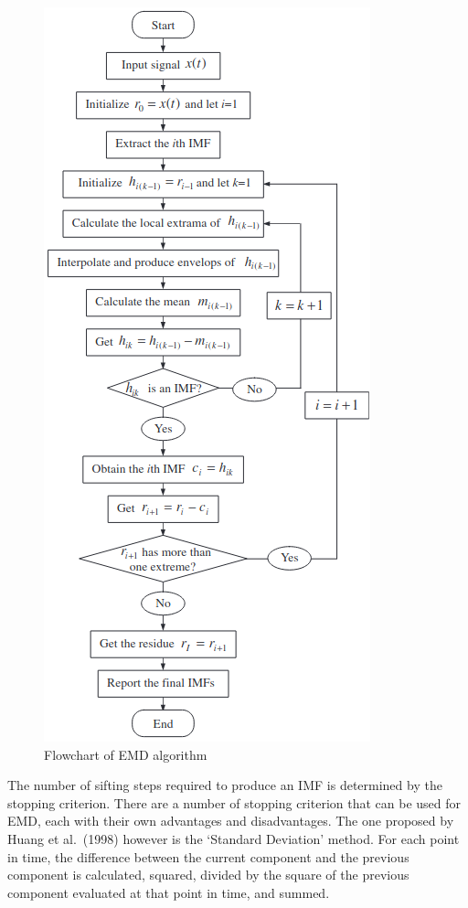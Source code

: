 \documentclass[
  paper=a4,
  ,captions=tableheading
]{scrartcl}
\begin{document}
\begin{figure}
\centering
\includegraphics{img/emd_flowchart.png}
\caption{Flowchart of EMD algorithm}
\end{figure}


The number of sifting steps required to produce an IMF is determined by
the stopping criterion. There are a number of stopping criterion that
can be used for EMD, each with their own advantages and disadvantages.
The one proposed by Huang et al.~(1998) however is the `Standard
Deviation' method. For each point in time, the difference between the
current component and the previous component is calculated, squared,
divided by the square of the previous component evaluated at that point
in time, and summed.
\end{document}
